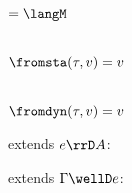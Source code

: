 \begin{flushleft}

 $= \langM$

\medskip
\begin{minipage}[t]{0.5\columnwidth}
\\
$\fromsta(\tau, v) = v$
\end{minipage}%
\begin{minipage}[t]{0.5\columnwidth}
\\
$\fromdyn(\tau, v) = v$
\end{minipage}

\medskip
{} extends $e \rrD A$:
\begin{mathpar}


\end{mathpar}

\medskip
{} extends $\Gamma \wellD e$:
\begin{mathpar}


\end{mathpar}

\end{flushleft}
